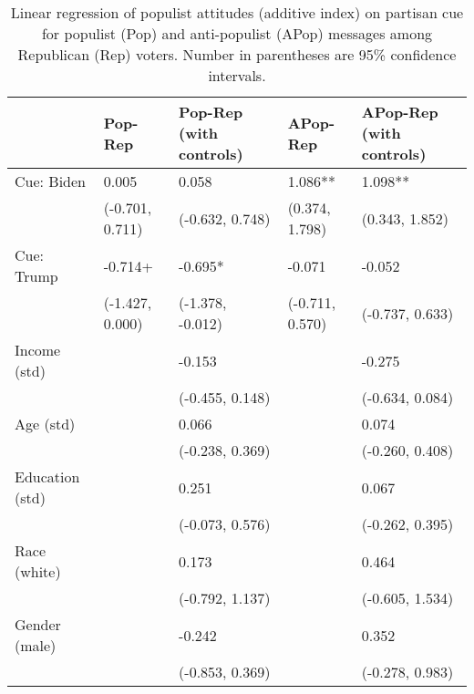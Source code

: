 \begin{table}[th!]
\centering
\caption{Linear regression of populist attitudes (additive index) on partisan cue for populist (Pop) and anti-populist (APop) messages among Republican (Rep) voters. Number in parentheses are 95\% confidence intervals.}
\label{tab-reg-rep-popadd.tex}
\begin{threeparttable}
\begin{tabular}{lC{3cm}C{3cm}C{3cm}C{3cm}}
\toprule
                &         Pop-Rep & Pop-Rep (with controls) &        APop-Rep & APop-Rep (with controls) \\
\midrule
     Cue: Biden &           0.005 &                   0.058 &         1.086** &                  1.098** \\
                & (-0.701, 0.711) &         (-0.632, 0.748) &  (0.374, 1.798) &           (0.343, 1.852) \\
     Cue: Trump &         -0.714+ &                 -0.695* &          -0.071 &                   -0.052 \\
                & (-1.427, 0.000) &        (-1.378, -0.012) & (-0.711, 0.570) &          (-0.737, 0.633) \\
   Income (std) &                 &                  -0.153 &                 &                   -0.275 \\
                &                 &         (-0.455, 0.148) &                 &          (-0.634, 0.084) \\
      Age (std) &                 &                   0.066 &                 &                    0.074 \\
                &                 &         (-0.238, 0.369) &                 &          (-0.260, 0.408) \\
Education (std) &                 &                   0.251 &                 &                    0.067 \\
                &                 &         (-0.073, 0.576) &                 &          (-0.262, 0.395) \\
   Race (white) &                 &                   0.173 &                 &                    0.464 \\
                &                 &         (-0.792, 1.137) &                 &          (-0.605, 1.534) \\
  Gender (male) &                 &                  -0.242 &                 &                    0.352 \\
                &                 &         (-0.853, 0.369) &                 &          (-0.278, 0.983) \\

\end{tabular}
\end{threeparttable}
\end{table}
